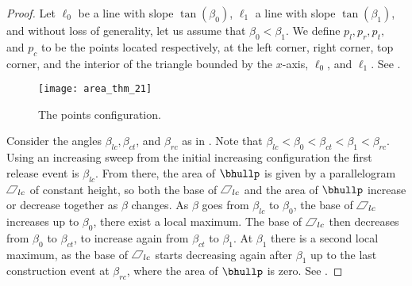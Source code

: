 \documentclass[11pt,letterpaper,english]{article}
\theoremstyle{definition}
\newcommand*{\parallelogram}[1][]{\pgfpicture\pgfsetroundjoin
    \pgftransformxslant{.6}\pgfpathrectangle{\pgfpointorigin}{\pgfpoint{.60em}{.65em}}\pgfusepath{stroke,#1}\endpgfpicture}
\begin{document}
\begin{proof}
  Let $\ell_0$ be a line with slope $\tan(\beta_0)$, $\ell_1$ a line
  with slope $\tan(\beta_1)$, and without loss of generality, let us
  assume that $\beta_0 < \beta_1$. We define $p_l, p_r,p_t,$ and $p_c$
  to be the points located respectively, at the left corner, right
  corner, top corner, and the interior of the triangle bounded by the
  $x$-axis, $\ell_0$, and $\ell_1$. See
  .

  \begin{figure}[ht]
    \centering
    \begin{minipage}{0.9\textwidth}
      \centering
      {\texttt{[image: area\_thm\_21]}}
      \caption{The points configuration.}
      \label{apps:area:fig:bimodal_1}
    \end{minipage}
  \end{figure}

  Consider the angles $\beta_{lc}, \beta_{ct}$, and $\beta_{rc}$ as in
  . Note that
  $\beta_{lc} < \beta_{0} < \beta_{ct} < \beta_{1} < \beta_{rc}$.
  Using an increasing sweep from the initial increasing configuration the
  first release event is $\beta_{lc}$. From there, the area of
  $\bhullp$ is given by a parallelogram $\parallelogram_{lc}$ of
  constant height, so both the base of $\parallelogram_{lc}$ and the
  area of $\bhullp$ increase or decrease together as $\beta$
  changes. As $\beta$ goes from $\beta_{lc}$ to $\beta_{0}$, the base
  of $\parallelogram_{lc}$ increases up to $\beta_0$, there
  exist a local maximum. The base of $\parallelogram_{lc}$ then
  decreases from $\beta_0$ to $\beta_{ct}$, to increase again from
  $\beta_{ct}$ to $\beta_{1}$. At $\beta_{1}$ there is a second local
  maximum, as the base of $\parallelogram_{lc}$ starts decreasing
  again after $\beta_{1}$ up to the last construction event at
  $\beta_{rc}$, where the area of $\bhullp$ is zero. See
  .
\end{proof}
\end{document}
